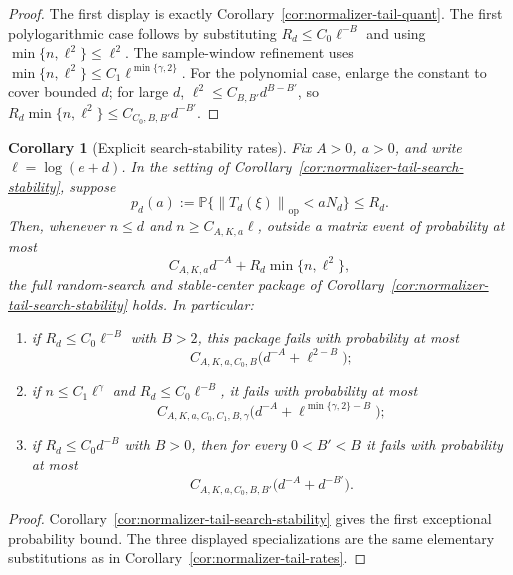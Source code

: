 \documentclass[11pt]{amsart}
\numberwithin{equation}{section}
\newtheorem{corollary}[theorem]{Corollary}
\theoremstyle{definition}
\theoremstyle{remark}
\newcommand{\op}{\mathrm{op}}
\newcommand{\Prob}{\mathbb P}
\newcommand{\norm}[1]{\left\lVert #1\right\rVert}
\begin{document}
\begin{proof}
The first display is exactly Corollary~\ref{cor:normalizer-tail-quant}.  The
first polylogarithmic case follows by substituting
\(R_d\le C_0\ell^{-B}\) and using \(\min\{n,\ell^2\}\le\ell^2\).  The
sample-window refinement uses
\(\min\{n,\ell^2\}\le C_1\ell^{\min\{\gamma,2\}}\).  For the polynomial case,
enlarge the constant to cover bounded \(d\); for large \(d\),
\(\ell^2\le C_{B,B'}d^{B-B'}\), so
\(R_d\min\{n,\ell^2\}\le C_{C_0,B,B'}d^{-B'}\).
\end{proof}

\begin{corollary}[Explicit search-stability rates]
\label{cor:normalizer-tail-search-rates}
Fix \(A>0\), \(a>0\), and write \(\ell=\log(e+d)\).  In the setting of
Corollary~\ref{cor:normalizer-tail-search-stability}, suppose
\[
  p_d(a):=\Prob\{\norm{T_d(\xi)}_{\op}<aN_d\}\le R_d .
\]
Then, whenever \(n\le d\) and \(n\ge C_{A,K,a}\ell\), outside a matrix event of
probability at most
\[
  C_{A,K,a}d^{-A}+R_d\min\{n,\ell^2\},
\]
the full random-search and stable-center package of
Corollary~\ref{cor:normalizer-tail-search-stability} holds.  In particular:
\begin{enumerate}[label=\textup{(\roman*)}]
\item if \(R_d\le C_0\ell^{-B}\) with \(B>2\), this package fails with probability
at most
\[
  C_{A,K,a,C_0,B}\bigl(d^{-A}+\ell^{2-B}\bigr);
\]
\item if \(n\le C_1\ell^\gamma\) and \(R_d\le C_0\ell^{-B}\), it fails with
probability at most
\[
  C_{A,K,a,C_0,C_1,B,\gamma}
  \bigl(d^{-A}+\ell^{\min\{\gamma,2\}-B}\bigr);
\]
\item if \(R_d\le C_0d^{-B}\) with \(B>0\), then for every \(0<B'<B\) it fails
with probability at most
\[
  C_{A,K,a,C_0,B,B'}\bigl(d^{-A}+d^{-B'}\bigr).
\]
\end{enumerate}
\end{corollary}

\begin{proof}
Corollary~\ref{cor:normalizer-tail-search-stability} gives the first exceptional
probability bound.  The three displayed specializations are the same elementary
substitutions as in Corollary~\ref{cor:normalizer-tail-rates}.
\end{proof}
\end{document}
